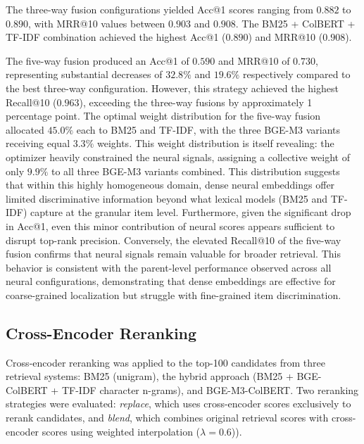 \documentclass[preprint,12pt]{elsarticle}
\begin{document}
The three-way fusion configurations yielded Acc@1 scores ranging from $0.882$ to $0.890$, with MRR@10 values between $0.903$ and $0.908$. The BM25 + ColBERT + TF-IDF combination achieved the highest Acc@1 ($0.890$) and MRR@10 ($0.908$). 

The five-way fusion produced an Acc@1 of $0.590$ and MRR@10 of $0.730$, representing substantial decreases of $32.8\%$ and $19.6\%$ respectively compared to the best three-way configuration. However, this strategy achieved the highest Recall@10 ($0.963$), exceeding the three-way fusions by approximately 1 percentage point. The optimal weight distribution for the five-way fusion allocated $45.0\%$ each to BM25 and TF-IDF, with the three BGE-M3 variants receiving equal $3.3\%$ weights.
This weight distribution is itself revealing: the optimizer heavily constrained the neural signals, assigning a collective weight of only $9.9\%$ to all three BGE-M3 variants combined. This distribution suggests that within this highly homogeneous domain, dense neural embeddings offer limited discriminative information beyond what lexical models (BM25 and TF-IDF) capture at the granular item level. Furthermore, given the significant drop in Acc@1, even this minor contribution of neural scores appears sufficient to disrupt top-rank precision. Conversely, the elevated Recall@10 of the five-way fusion confirms that neural signals remain valuable for broader retrieval. This behavior is consistent with the parent-level performance observed across all neural configurations, demonstrating that dense embeddings are effective for coarse-grained localization but struggle with fine-grained item discrimination.


\subsection{Cross-Encoder Reranking}
Cross-encoder reranking was applied to the top-100 candidates from three retrieval systems: BM25 (unigram), the hybrid approach (BM25 + BGE-ColBERT + TF-IDF character n-grams), and BGE-M3-ColBERT. Two reranking strategies were evaluated: \textit{replace}, which uses cross-encoder scores exclusively to rerank candidates, and \textit{blend}, which combines original retrieval scores with cross-encoder scores using weighted interpolation ($\lambda=0.6$)).
\end{document}
